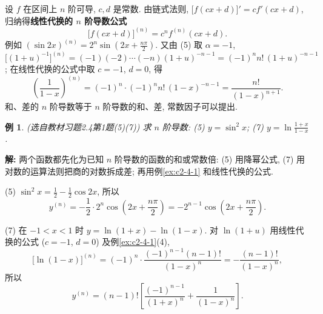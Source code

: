 \documentclass[UTF8,openany]{ctexbook}
\theoremstyle{chinesetextbook}
\newtheorem{example}{例}[section]
\newenvironment{cnsolution}{\par\indent\textbf{解:} \ignorespaces}{\par}
\begin{document}
设 $f$ 在区间上 $n$ 阶可导, $c,d$ 是常数. 由链式法则, $\bigl[f(cx+d)\bigr]'=cf'(cx+d)$, 归纳得\textbf{线性代换的 $n$ 阶导数公式}
\[
\bigl[f(cx+d)\bigr]^{(n)}=c^nf^{(n)}(cx+d).
\]
例如 $\displaystyle(\sin2x)^{(n)}=2^n\sin\left(2x+\frac{n\pi}2\right)$. 又由 (5) 取 $\alpha=-1$, $\bigl[(1+u)^{-1}\bigr]^{(n)}=(-1)(-2)\cdots(-n)(1+u)^{-n-1}=(-1)^nn!\,(1+u)^{-n-1}$; 在线性代换的公式中取 $c=-1$, $d=0$, 得
\[
\left(\frac1{1-x}\right)^{(n)}=(-1)^n\cdot(-1)^nn!\,(1-x)^{-n-1}=\frac{n!}{(1-x)^{n+1}}.
\]
和、差的 $n$ 阶导数等于 $n$ 阶导数的和、差, 常数因子可以提出.
\begin{example}\label{ex:c2-h4-1}
\textnormal{(选自教材习题2.4第1题(5)(7))} 求 $n$ 阶导数: (5) $y=\sin^2x$; (7) $\displaystyle y=\ln\frac{1+x}{1-x}$.
\end{example}
\begin{cnsolution}
两个函数都先化为已知 $n$ 阶导数的函数的和或常数倍: (5) 用降幂公式, (7) 用对数的运算法则把商的对数拆成差; 再用例\ref{ex:c2-4-1} 和线性代换的公式.

(5) $\displaystyle\sin^2x=\frac12-\frac12\cos2x$, 所以
\[
y^{(n)}=-\frac12\cdot2^n\cos\left(2x+\frac{n\pi}2\right)=-2^{n-1}\cos\left(2x+\frac{n\pi}2\right).
\]

(7) 在 $-1<x<1$ 时 $y=\ln(1+x)-\ln(1-x)$. 对 $\ln(1+u)$ 用线性代换的公式 ($c=-1$, $d=0$) 及例\ref{ex:c2-4-1}(4),
\[
\bigl[\ln(1-x)\bigr]^{(n)}=(-1)^n\cdot\frac{(-1)^{n-1}(n-1)!}{(1-x)^n}=-\frac{(n-1)!}{(1-x)^n},
\]
所以
\[
y^{(n)}=(n-1)!\left[\frac{(-1)^{n-1}}{(1+x)^n}+\frac1{(1-x)^n}\right].
\]
\end{cnsolution}
\end{document}

